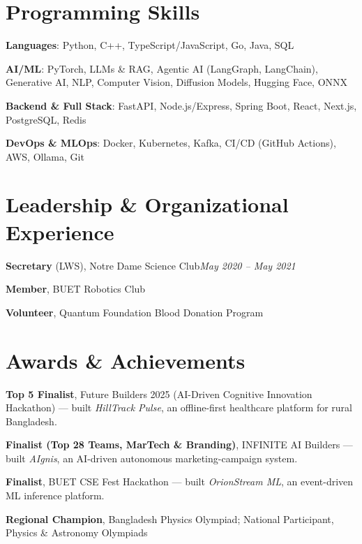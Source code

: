 \documentclass[a4paper,11pt]{article}
\begin{document}
\section{Programming Skills}

\begin{tight}
    \item \textbf{Languages}: Python, C++, TypeScript/JavaScript, Go, Java, SQL
    \item \textbf{AI/ML}: PyTorch, LLMs \& RAG, Agentic AI (LangGraph, LangChain), Generative AI, NLP, Computer Vision, Diffusion Models, Hugging Face, ONNX
    \item \textbf{Backend \& Full Stack}: FastAPI, Node.js/Express, Spring Boot, React, Next.js, PostgreSQL, Redis
    \item \textbf{DevOps \& MLOps}: Docker, Kubernetes, Kafka, CI/CD (GitHub Actions), AWS, Ollama, Git
\end{tight}\vspace{2pt}

\section{Leadership \& Organizational Experience}

\textbf{Secretary} (LWS), Notre Dame Science Club\hfill\textit{May 2020 -- May 2021}\par
\textbf{Member}, BUET Robotics Club\par
\textbf{Volunteer}, Quantum Foundation Blood Donation Program\vspace{2pt}

\section{Awards \& Achievements}

\begin{tight}
    \item \textbf{Top 5 Finalist}, Future Builders 2025 (AI-Driven Cognitive Innovation Hackathon) --- built \textit{HillTrack Pulse}, an offline-first healthcare platform for rural Bangladesh.
    \item \textbf{Finalist (Top 28 Teams, MarTech \& Branding)}, INFINITE AI Builders --- built \textit{AIgnis}, an AI-driven autonomous marketing-campaign system.
    \item \textbf{Finalist}, BUET CSE Fest Hackathon --- built \textit{OrionStream ML}, an event-driven ML inference platform.
    \item \textbf{Regional Champion}, Bangladesh Physics Olympiad; National Participant, Physics \& Astronomy Olympiads
\end{tight}
\end{document}
